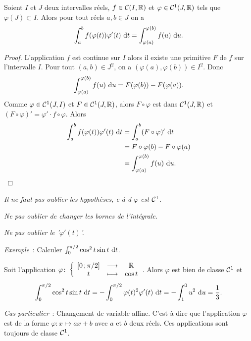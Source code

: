\begin{theo}
  Soient \(I\) et \(J\) deux intervalles réels, \(f \in \mathcal{C}(I,\mathbb{R})\) et 
  \(\varphi \in \mathcal{C}^{1}(J,\mathbb{R})\) tels que \(\varphi(J) \subset I\). Alors pour 
  tout réels \(a, b \in J\) on a
  \begin{equation}
    \int_a^b f(\varphi(t)) \varphi'(t)\,\mathop{}\mathopen{}\mathrm{d} t = \int_{\varphi(a)}^{\varphi(b)} 
    f(u)\,\mathop{}\mathopen{}\mathrm{d} u.
  \end{equation}
\end{theo}
\begin{proof}
  L'application \(f\) est continue sur \(I\) alors il existe une primitive \(F\) 
  de \(f\) sur l'intervalle \(I\). Pour tout \((a,b) \in J^2\), on a 
  \((\varphi(a), \varphi(b)) \in I^2\). Donc
  \begin{equation}
    \int_{\varphi(a)}^{\varphi(b)}f(u)\,\mathop{}\mathopen{}\mathrm{d} u = F(\varphi(b)) - F(\varphi(a)).
  \end{equation}
  Comme \(\varphi \in \mathcal{C}^{1}(J,I)\) et \(F \in \mathcal{C}^{1}(J,\mathbb{R})\), alors \(F 
  \circ \varphi\) est dans  \(\mathcal{C}^{1}(J,\mathbb{R})\) et \((F\circ \varphi)' = \varphi' 
  \cdot f \circ \varphi\). Alors
  \begin{align*}
    \int_a^b f(\varphi(t)) \varphi'(t)\,\mathop{}\mathopen{}\mathrm{d} t &= \int_a^b (F\circ 
    \varphi)'\,\mathop{}\mathopen{}\mathrm{d} t\\
    & = F\circ \varphi(b) - F\circ \varphi(a) \\
    & = \int_{\varphi(a)}^{\varphi(b)}f(u)\,\mathop{}\mathopen{}\mathrm{d} u.
  \end{align*}
\end{proof}

\danger \emph{Il ne faut pas oublier les hypothèses, c-à-d \(\varphi\) est 
\(\mathcal{C}^{1}\).}

\danger \emph{Ne pas oublier de changer les bornes de l'intégrale.}

\danger \emph{Ne pas oublier le '\(\varphi'(t)\)'.}

\emph{Exemple}~: Calculer \(\int_0^{\pi/2} \cos^2 t \sin t\,\mathop{}\mathopen{}\mathrm{d} t\). 

Soit l'application \(\varphi\colon\left\{\begin{array}{ccc}\left[ 0 \, ; {} \pi/2 \right] & \longrightarrow &\mathbb{R}\\t & \longmapsto & \cos 
t\end{array}\right.\). Alors \(\varphi\) est bien de classe \(\mathcal{C}^{1}\) et
\begin{equation}
  \int_0^{\pi/2} \cos^2 t \sin t\,\mathop{}\mathopen{}\mathrm{d} t = -\int_0^{\pi/2} 
  \varphi(t)^2\varphi'(t)\,\mathop{}\mathopen{}\mathrm{d} t = -\int_1^0 u^2\,\mathop{}\mathopen{}\mathrm{d} u =\frac{1}{3}.
\end{equation}


\emph{Cas particulier}~: Changement de variable affine. C'est-à-dire que 
l'application \(\varphi\) est de la forme \(\varphi : x \longmapsto ax+b\) avec 
\(a\) et \(b\) deux réels. Ces applications sont toujours de classe 
\(\mathcal{C}^{1}\).


